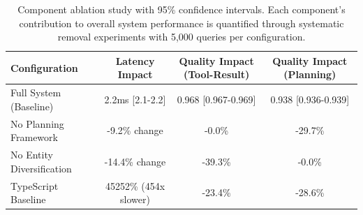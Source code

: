 \begin{table}[h]
\centering
\caption{Component ablation study with 95\% confidence intervals. Each component's contribution to overall system performance is quantified through systematic removal experiments with 5,000 queries per configuration.}
\label{tab:ablation_study}
\begin{tabular}{lccc}
\toprule
\textbf{Configuration} & \textbf{Latency Impact} & \textbf{Quality Impact (Tool-Result)} & \textbf{Quality Impact (Planning)} \\
\midrule
Full System (Baseline) & 2.2ms [2.1-2.2] & 0.968 [0.967-0.969] & 0.938 [0.936-0.939] \\
No Planning Framework & -9.2\% change & -0.0\% & -29.7\% \\
No Entity Diversification & -14.4\% change & -39.3\% & -0.0\% \\
TypeScript Baseline & 45252\% (454x slower) & -23.4\% & -28.6\% \\
\bottomrule
\end{tabular}
\end{table}